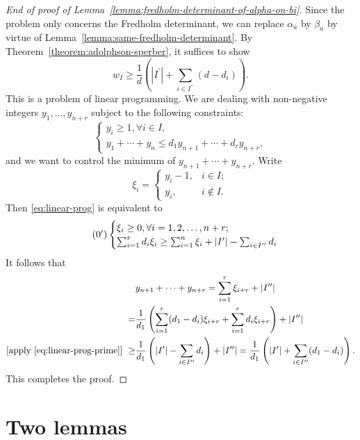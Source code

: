 \documentclass{amsart}
\numberwithin{equation}{section}
\theoremstyle{plain}
\theoremstyle{definition}
\begin{document}
\begin{proof}[End of proof of Lemma~\ref{lemma:fredholm-determinant-of-alpha-on-bi}]
Since the problem only concerns the Fredholm determinant, we can
replace \(\alpha_{a}\) by \(\beta_{a}\) by virtue of
Lemma~\ref{lemma:same-fredholm-determinant}.  By
Theorem~\ref{theorem:adolphson-sperber}, it suffices to show
\[
w_I \geq \frac{1}{d}\left( |I^{\prime}|+ \sum_{i\in I^{\prime\prime}} (d-d_i)  \right).
\]
This is a problem of linear programming.  We are dealing with
non-negative integers \(y_1,\ldots,y_{n+r}\) subject to the following
constraints:
\begin{equation}\label{eq:linear-prog}
\begin{cases}
  y_i \geq 1, \forall i \in I, \\
  y_1+\cdots + y_n\leq d_1y_{n+1}+\cdots +d_r y_{n+r},
\end{cases}
\end{equation}
and we want to control the minimum of \(y_{n+1} + \cdots + y_{n+r}\).
Write
\[
\xi_i =
\begin{cases}
  y_i - 1, & i \in I; \\
  y_i, & i \notin I.
\end{cases}
\]
Then \eqref{eq:linear-prog} is equivalent to
\begin{equation}\tag{\theequation${}^{\prime}$}
\label{eq:linear-prog-prime}
\begin{cases}
  \xi_i \geq 0, \forall i =1,2,\ldots,n+r; \\
  \sum_{i=1}^{r}d_i \xi_i \geq \sum_{i=1}^{n}\xi_i + |I^{\prime}| - \sum_{i\in I^{\prime\prime}}d_{i}
\end{cases}
\end{equation}
It follows that
\begin{align*}
  &y_{n+1} + \cdots + y_{n+r}  = \sum_{i=1}^{r} \xi_{i+r} + |I^{\prime\prime}| \\
  =& \frac{1}{d_1}\left( \sum_{i=1}^{r} (d_1-d_i)\xi_{i+r} + \sum_{i=1}^{r} d_i \xi_{i+r}\right) + |I^{\prime\prime}| \\
  \text{[apply \eqref{eq:linear-prog-prime}]}~\geq & \frac{1}{d_1}\left(|I^{\prime}| - \sum_{i\in I^{\prime\prime}}d_i\right) + |I^{\prime\prime}|
                                                     = \frac{1}{d_1}\left(|I^{\prime}| + \sum_{i\in I^{\prime\prime}}(d_1-d_i)\right).
\end{align*}
This completes the proof.
\end{proof}

\section{Two lemmas}
\label{sec:algebra}
\end{document}
